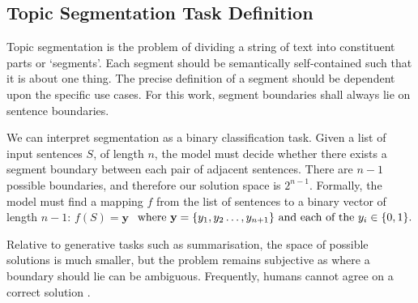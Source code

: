 
\subsection{Topic Segmentation Task Definition}
Topic segmentation is the problem of dividing a string of text into constituent parts or ‘segments’. Each segment should be semantically self-contained such that it is about one thing. The precise definition of a segment should be dependent upon the specific use cases. For this work, segment boundaries shall always lie on sentence boundaries.

We can interpret segmentation as a binary classification task.  Given a list of input sentences $S$, of length $n$, the model must decide whether there exists a segment boundary between each pair of adjacent sentences. There are $n-1$ possible boundaries, and therefore our solution space is $2^{n-1}$.  Formally, the model must find a mapping $f$ from the list of sentences to a binary vector of length $n-1$:
\(
     f(S) = \textbf{y} 
\)
\( \textnormal{ where } \textbf{y}=\{y_1,y_2\ldots,y_{n+1}\} \textnormal{ and each of the } y_i\in\{0,1\}.
\)

Relative to generative tasks such as summarisation, the space of possible solutions is much smaller, but the problem remains subjective as where a boundary should lie can be ambiguous. Frequently, humans cannot agree on a correct solution \cite{TextTiling}.



 
